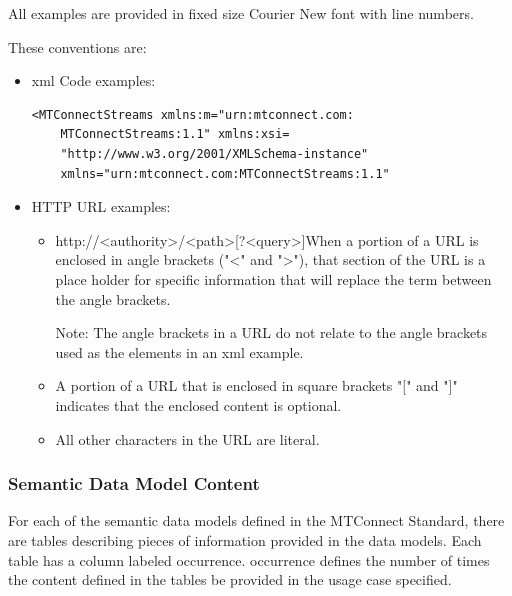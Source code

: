 All examples are provided in fixed size Courier New font with line numbers.

These conventions are:

\begin{itemize}

\item \gls{xml} Code examples:

\begin{lstlisting}[firstnumber=last,escapechar=|,%
    caption={XML Code Examples},label={lst:xml-code-examples}]
<MTConnectStreams xmlns:m="urn:mtconnect.com:
    MTConnectStreams:1.1" xmlns:xsi=
    "http://www.w3.org/2001/XMLSchema-instance"
    xmlns="urn:mtconnect.com:MTConnectStreams:1.1"
\end{lstlisting}

\item HTTP URL examples:

\begin{itemize}

\item	http://<authority>/<path>[?<query>]When a portion of a URL is enclosed in angle brackets ("<" and ">"), that section of the URL is a place holder for specific information that will replace the term between the angle brackets. 

\begin{note}
Note:  The angle brackets in a URL do not relate to the angle brackets used as the  elements in an \gls{xml} example.

\end{note}

\item A portion of a URL that is enclosed in square brackets "[" and "]" indicates that the enclosed content is optional. 

\item All other characters in the URL are literal.

\end{itemize}

\end{itemize}

\subsubsection{Semantic Data Model Content}

For each of the \glspl{semantic data model} defined in the MTConnect Standard, there are tables describing pieces of information provided in the data models.  Each table has a column labeled \gls{occurrence}. \gls{occurrence} defines the number of times the content defined in the tables \MAY be provided in the usage case specified.

